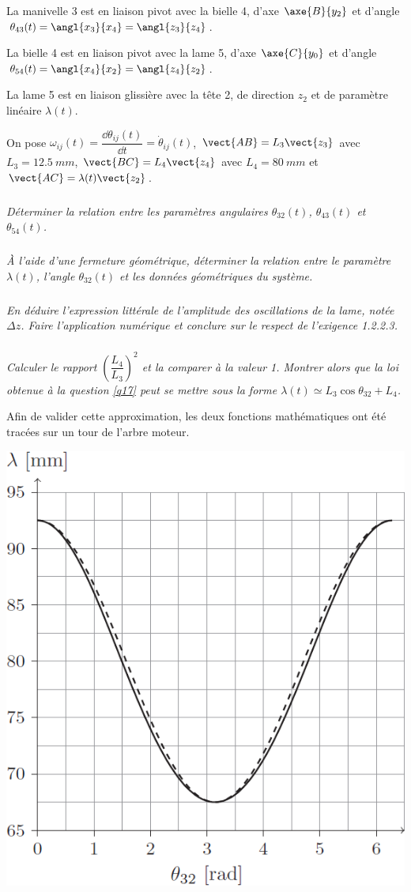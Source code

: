 \begin{multicols}{2}
La manivelle 3 est en liaison pivot avec la bielle 4, d'axe $\axe{B}{y_2}$ et d'angle $\theta_{43}(t)=\angl{x_3}{x_4}=\angl{z_3}{z_4}$.

La bielle 4 est en liaison pivot avec la lame 5, d'axe $\axe{C}{y_0}$ et d'angle $\theta_{54}(t)=\angl{x_4}{x_2}=\angl{z_4}{z_2}$.


La lame 5 est en liaison glissière avec la tête 2, de direction ${z_2}$ et de paramètre linéaire $\lambda(t)$.

On pose $\omega_{ij}(t)=\dfrac{\dd \theta_{ij}(t)}{\dd t} = \dot{\theta}_{ij}(t)$, $\vect{AB}=L_3\vect{z_3}$ avec $L_3=\SI{12,5}{mm}$, $\vect{BC}=L_4\vect{z_4}$ avec $L_4=\SI{80}{mm}$ et $\vect{AC}=\lambda(t)\vect{z_2}$.

\subparagraph{\label{q17}}
\textit{Déterminer la relation entre les paramètres angulaires $\theta_{32}(t)$, $\theta_{43}(t)$ et $\theta_{54}(t)$.}
\ifprof
\begin{corrige}
\end{corrige}
\else
\fi


\subparagraph{}
\textit{À l’aide d’une fermeture géométrique, déterminer la relation entre le paramètre $\lambda(t)$, l’angle
$\theta_{32}(t)$ et les données géométriques du système.}
\ifprof
\begin{corrige}
\end{corrige}
\else
\fi


\subparagraph{}
\textit{En déduire l’expression littérale de l’amplitude des oscillations de la lame, notée $\Delta z$. Faire
l’application numérique et conclure sur le respect de l’exigence 1.2.2.3.}
\ifprof
\begin{corrige}
\end{corrige}
\else
\fi


\subparagraph{}
\textit{Calculer le rapport $\left(\dfrac{L_4}{L_3}\right)^2$ et la comparer à la valeur 1. Montrer alors que la loi obtenue à la question \ref{q17} peut se mettre sous la forme $\lambda(t)\simeq L_3 \cos \theta_{32}+L_4$.}
\ifprof
\begin{corrige}
\end{corrige}
\else
\fi

Afin de valider cette approximation, les deux fonctions mathématiques ont été tracées sur un tour de
l’arbre moteur.
\begin{center}
\includegraphics[width=.45\linewidth]{images/fig_04}


\end{center}
\end{multicols}
